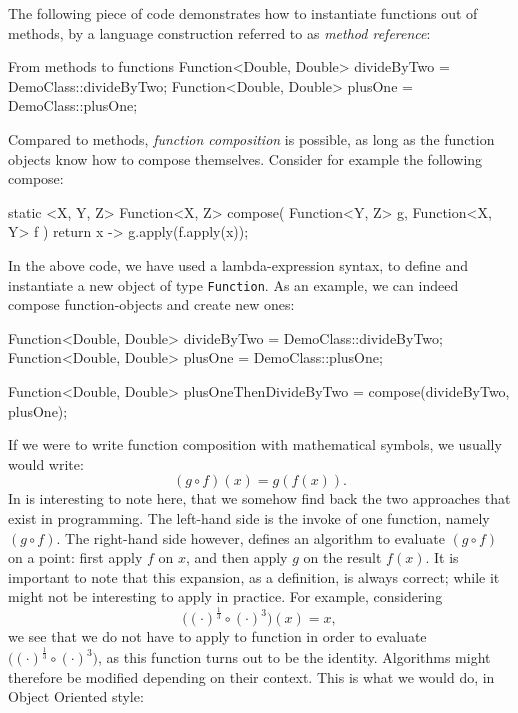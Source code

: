 \documentclass[12pt,a4paper]{report}
\renewcommand{\baselinestretch}{1.5}
\theoremstyle{theorem}
\theoremstyle{definition}
\begin{document}
\renewcommand{\baselinestretch}{1.5} 
\selectfont

The following piece of code demonstrates how to instantiate functions
out of methods, by a language construction referred to as
\emph{method reference}:

\renewcommand{\baselinestretch}{1} 
\selectfont

\begin{javacode}{From methods to functions}
Function<Double, Double> divideByTwo = DemoClass::divideByTwo;
Function<Double, Double> plusOne = DemoClass::plusOne;
\end{javacode}

\renewcommand{\baselinestretch}{1.5} 
\selectfont

Compared to methods, \emph{function composition} is possible,
as long as the function objects know how to compose themselves.
Consider for example the following compose:

\renewcommand{\baselinestretch}{1} 
\selectfont
\begin{javacode}
static <X, Y, Z> Function<X, Z> compose(
  Function<Y, Z> g,
  Function<X, Y> f
)
  { return x -> g.apply(f.apply(x)); }
\end{javacode}

\renewcommand{\baselinestretch}{1.5} 
\selectfont

In the above code, we have used a lambda-expression syntax, to define and
instantiate a new object of type \lstinline{Function}{}.
As an example, we can indeed compose function-objects and create new ones:

\renewcommand{\baselinestretch}{1} 
\selectfont
\begin{javacode}
Function<Double, Double> divideByTwo = DemoClass::divideByTwo;
Function<Double, Double> plusOne = DemoClass::plusOne;

Function<Double, Double> plusOneThenDivideByTwo
	= compose(divideByTwo, plusOne);
\end{javacode}

\renewcommand{\baselinestretch}{1.5} 
\selectfont

If we were to write function composition
with mathematical symbols, we usually would write:
	\[ (g\circ f)(x) = g(f(x)) .\]
In is interesting to note here, that we somehow find back the two
approaches that exist in programming. The left-hand side 
is the invoke of one function, namely $(g\circ f)$.
The right-hand side however, defines an algorithm to evaluate $(g\circ f)$
on a point:
first apply $f$ on $x$, and then apply $g$ on the result $f(x)$.
It is important to note that this expansion, as a definition, is always correct;
while it might not be interesting to apply in practice.
For example, considering
	\[ \big((\cdot)^{\frac{1}{3}} \circ (\cdot)^3\big)(x) = x ,\]
we see that we do not have to apply to function
in order to evaluate $\big((\cdot)^{\frac{1}{3}} \circ (\cdot)^3\big)$,
as this function turns out to be the identity. Algorithms might therefore
be modified depending on their context. This is what we would do, in
Object Oriented style:
\end{document}
